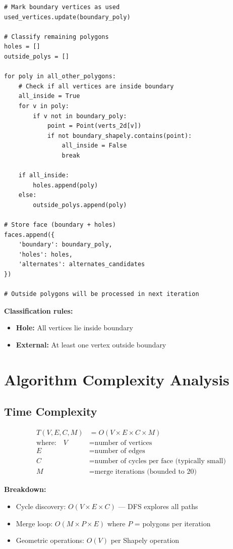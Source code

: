 \documentclass[11pt]{article}
\begin{document}
\begin{lstlisting}[caption={Classifying remaining polygons as holes or external},label={lst:classify}]
# Mark boundary vertices as used
used_vertices.update(boundary_poly)

# Classify remaining polygons
holes = []
outside_polys = []

for poly in all_other_polygons:
    # Check if all vertices are inside boundary
    all_inside = True
    for v in poly:
        if v not in boundary_poly:
            point = Point(verts_2d[v])
            if not boundary_shapely.contains(point):
                all_inside = False
                break
    
    if all_inside:
        holes.append(poly)
    else:
        outside_polys.append(poly)

# Store face (boundary + holes)
faces.append({
    'boundary': boundary_poly,
    'holes': holes,
    'alternates': alternates_candidates
})

# Outside polygons will be processed in next iteration
\end{lstlisting}

\textbf{Classification rules:}
\begin{itemize}
    \item \textbf{Hole:} All vertices lie inside boundary
    \item \textbf{External:} At least one vertex outside boundary
\end{itemize}

\section{Algorithm Complexity Analysis}

\subsection{Time Complexity}

\begin{align*}
T(V, E, C, M) &= O(V \times E \times C \times M) \\
\text{where:} \quad
V &= \text{number of vertices} \\
E &= \text{number of edges} \\
C &= \text{number of cycles per face (typically small)} \\
M &= \text{merge iterations (bounded to 20)}
\end{align*}

\textbf{Breakdown:}
\begin{itemize}
    \item Cycle discovery: $O(V \times E \times C)$ — DFS explores all paths
    \item Merge loop: $O(M \times P \times E)$ where $P$ = polygons per iteration
    \item Geometric operations: $O(V)$ per Shapely operation
\end{itemize}
\end{document}
